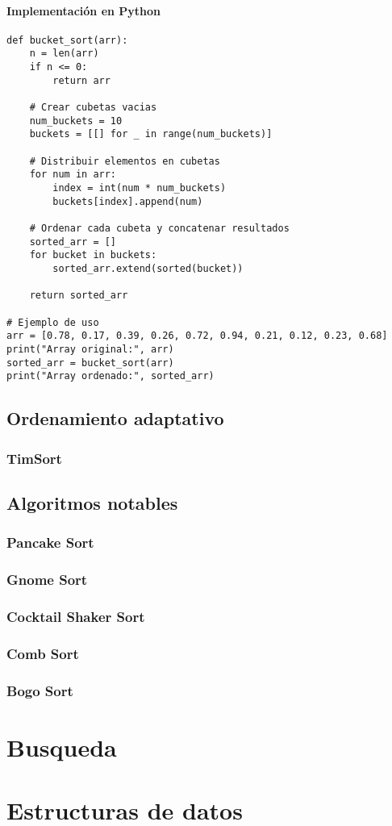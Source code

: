 \documentclass[11pt,openany]{book}
\begin{document}
\subsubsection{Implementación en Python}
\lstset{language=Python}
\begin{lstlisting}
def bucket_sort(arr):
    n = len(arr)
    if n <= 0:
        return arr

    # Crear cubetas vacias
    num_buckets = 10
    buckets = [[] for _ in range(num_buckets)]

    # Distribuir elementos en cubetas
    for num in arr:
        index = int(num * num_buckets)
        buckets[index].append(num)

    # Ordenar cada cubeta y concatenar resultados
    sorted_arr = []
    for bucket in buckets:
        sorted_arr.extend(sorted(bucket))

    return sorted_arr

# Ejemplo de uso
arr = [0.78, 0.17, 0.39, 0.26, 0.72, 0.94, 0.21, 0.12, 0.23, 0.68]
print("Array original:", arr)
sorted_arr = bucket_sort(arr)
print("Array ordenado:", sorted_arr)
\end{lstlisting}

\section{Ordenamiento adaptativo}
\subsection{TimSort}

\section{Algoritmos notables}
\subsection{Pancake Sort}
\subsection{Gnome Sort}
\subsection{Cocktail Shaker Sort}
\subsection{Comb Sort}
\subsection{Bogo Sort}
\printnotes*


\chapter{Busqueda}


\printnotes*

\chapter{Estructuras de datos}


\printnotes*
\end{document}
